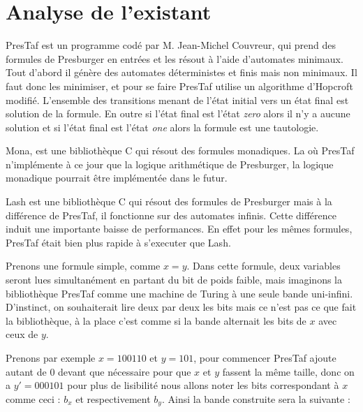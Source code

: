 \section{Analyse de l'existant}

PresTaf est un programme codé par M. Jean-Michel Couvreur, qui prend des formules de Presburger en entrées et les résout à l'aide d'automates minimaux. Tout d'abord il génère des automates déterministes et finis mais non minimaux. Il faut donc les minimiser, et pour se faire PresTaf utilise un algorithme d'Hopcroft modifié. L'ensemble des transitions menant de l'état initial vers un état final est solution de la formule. En outre si l'état final est l'état \emph{zero} alors il n'y a aucune solution et si l'état final est l'état \emph{one} alors la formule est une tautologie.\\\par

\clearpage Mona, est une bibliothèque C qui résout des formules monadiques. La où PresTaf n'implémente à ce jour que la logique arithmétique de Presburger, la logique monadique pourrait être implémentée dans le futur.\\\par

Lash\cite{lash} est une bibliothèque C qui résout des formules de Presburger mais à la différence de PresTaf, il fonctionne sur des automates infinis. Cette différence induit une importante baisse de performances. En effet pour les mêmes formules, PresTaf était bien plus rapide à s'executer que Lash\cite{DBLP:conf/wia/Couvreur04}.\\\par

Prenons une formule simple, comme $x = y$. Dans cette formule, deux variables seront lues simultanément en partant du bit de poids faible, mais imaginons la bibliothèque PresTaf comme une machine de Turing à une seule bande uni-infini. D'instinct, on souhaiterait lire deux par deux les bits mais ce n'est pas ce que fait la bibliothèque, à la place c'est comme si la bande alternait les bits de $x$ avec ceux de $y$.\\\par
Prenons par exemple $x = 100110$ et $y = 101$, pour commencer PresTaf ajoute autant de 0 devant que nécessaire pour que $x$ et $y$ fassent la même taille, donc on a $y'=000101$ pour plus de lisibilité nous allons noter les bits correspondant à $x$ comme ceci : $b_x$ et respectivement $b_y$. Ainsi la bande construite sera la suivante :

